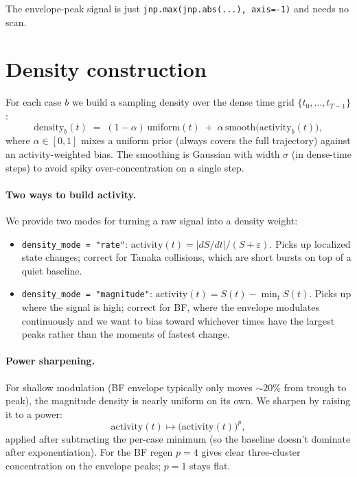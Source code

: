 \documentclass[11pt]{article}
\begin{document}
The envelope-peak signal is just \texttt{jnp.max(jnp.abs(...), axis=-1)} and
needs no scan.

\section{Density construction}

For each case $b$ we build a sampling density over the dense time grid
$\{t_0, \ldots, t_{T-1}\}$:
\[
  \mathrm{density}_b(t) \;=\; (1 - \alpha)\,\mathrm{uniform}(t) \;+\; \alpha \, \mathrm{smooth}\bigl(\mathrm{activity}_b(t)\bigr),
\]
where $\alpha \in [0, 1]$ mixes a uniform prior (always covers the full
trajectory) against an activity-weighted bias. The smoothing is Gaussian with
width $\sigma$ (in dense-time steps) to avoid spiky over-concentration on a
single step.

\paragraph{Two ways to build activity.}
We provide two modes for turning a raw signal into a density weight:

\begin{itemize}
  \item \texttt{density\_mode = "rate"}: $\mathrm{activity}(t) = |dS/dt| / (S + \varepsilon)$.
  Picks up localized state changes; correct for Tanaka collisions, which are
  short bursts on top of a quiet baseline.

  \item \texttt{density\_mode = "magnitude"}: $\mathrm{activity}(t) = S(t) - \min_t S(t)$.
  Picks up where the signal is high; correct for BF, where the envelope
  modulates continuously and we want to bias toward whichever times have the
  largest peaks rather than the moments of fastest change.
\end{itemize}

\paragraph{Power sharpening.}
For shallow modulation (BF envelope typically only moves $\sim 20\%$ from
trough to peak), the magnitude density is nearly uniform on its own. We
sharpen by raising it to a power:
\[
  \mathrm{activity}(t) \mapsto \bigl(\mathrm{activity}(t)\bigr)^p,
\]
applied after subtracting the per-case minimum (so the baseline doesn't
dominate after exponentiation). For the BF regen $p = 4$ gives clear
three-cluster concentration on the envelope peaks; $p = 1$ stays flat.
\end{document}
